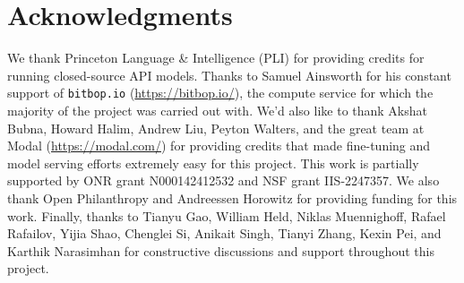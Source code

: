 \section*{Acknowledgments}
We thank Princeton Language \& Intelligence (PLI) for providing credits for running closed-source API models.
Thanks to Samuel Ainsworth for his constant support of \texttt{bitbop.io} (\url{https://bitbop.io/}), the compute service for which the majority of the project was carried out with.
We'd also like to thank Akshat Bubna, Howard Halim, Andrew Liu, Peyton Walters, and the great team at Modal (\url{https://modal.com/}) for providing credits that made fine-tuning and model serving efforts extremely easy for this project.
This work is partially supported by ONR grant N000142412532 and NSF grant IIS-2247357.
We also thank Open Philanthropy and Andreessen Horowitz for providing funding for this work.
Finally, thanks to Tianyu Gao, William Held, Niklas Muennighoff, Rafael Rafailov, Yijia Shao, Chenglei Si, Anikait Singh, Tianyi Zhang, Kexin Pei, and Karthik Narasimhan for constructive discussions and support throughout this project.

